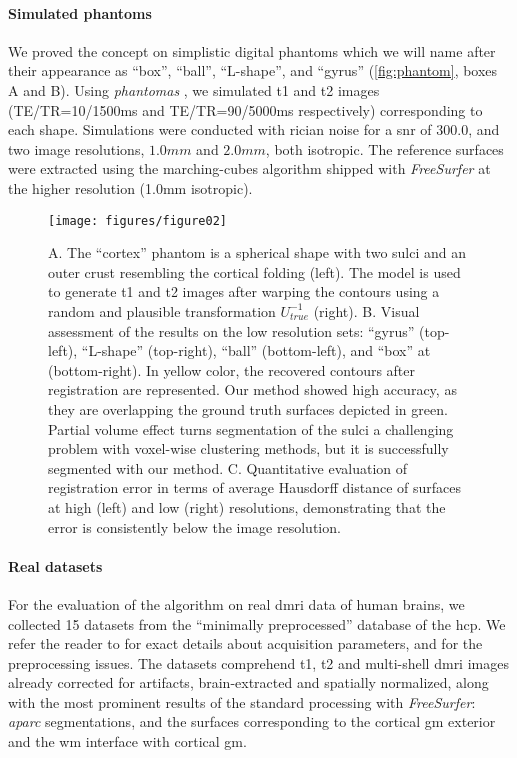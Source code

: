 \paragraph*{Simulated phantoms}%
\label{sec:digital_phantoms}
We proved the concept on simplistic digital phantoms which we will name after their
  appearance as ``box'', ``ball'', ``L-shape'', and ``gyrus'' (\autoref{fig:phantom},
  boxes A and B).
Using \emph{phantomas} \citep{caruyer_phantomas_2014}, we simulated \gls*{t1} and
  \gls*{t2} images (TE/TR=10/1500ms and TE/TR=90/5000ms
  respectively) corresponding to each shape.
Simulations were conducted with rician noise for a \gls*{snr} of 300.0, and
  two image resolutions, $1.0mm$ and $2.0mm$, both isotropic.
The reference surfaces were extracted using the marching-cubes algorithm
  shipped with \emph{FreeSurfer} \citep{fischl_freesurfer_2012}
  at the higher resolution (1.0mm isotropic).

\begin{figure*}
	\texttt{[image: figures/figure02]}
	\caption{A. The ``cortex'' phantom is a spherical shape with two sulci and an
	  outer crust resembling the cortical folding (left).
	The model is used to generate \gls*{t1} and \gls*{t2} images after warping the
	  contours using a random and plausible transformation $U_{true}^{-1}$ (right).
	B. Visual assessment of the results on the low resolution sets:
	  ``gyrus'' (top-left), ``L-shape'' (top-right), ``ball'' (bottom-left),
	  and ``box'' at (bottom-right).
	In yellow color, the recovered contours after registration are represented.
	Our method showed high accuracy, as they are overlapping the ground truth surfaces
	  depicted in green.
	Partial volume effect turns segmentation of the sulci a challenging problem with voxel-wise
	  clustering methods, but it is successfully segmented with our method.
	C. Quantitative evaluation of registration error in terms of average Hausdorff distance of
	  surfaces at high (left) and low (right) resolutions, demonstrating that the error is
	  consistently below the image resolution.
	  }\label{fig:phantom}
\end{figure*}

\paragraph*{Real datasets} %
\label{sec:human_connectome}
%
For the evaluation of the algorithm on real \gls*{dmri} data of human brains,
  we collected 15 datasets from the ``minimally preprocessed''
	 database of the \gls*{hcp}.
We refer the reader to \citep{essen_human_2012} for exact details about acquisition
  parameters, and \citep{glasser_minimal_2013} for the preprocessing issues.
The datasets comprehend \gls*{t1}, \gls*{t2} and multi-shell \gls*{dmri} images
  already corrected for artifacts, brain-extracted and spatially normalized,
  along with the most prominent results of the standard processing with
  \emph{FreeSurfer}: \emph{aparc} segmentations, and the surfaces corresponding to
  the cortical \gls*{gm} exterior and the \gls*{wm} interface with
  cortical \gls*{gm}.
